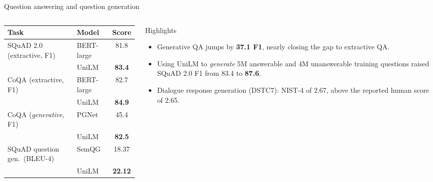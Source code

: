 \documentclass[aspectratio=169,11pt]{beamer}
\begin{document}
\begin{frame}{Question answering and question generation}
  \begin{columns}[T]
    \begin{column}{0.5\textwidth}
      \footnotesize
      \begin{tabular}{@{}llc@{}}
        \toprule
        Task & Model & Score\\
        \midrule
        SQuAD 2.0 (extractive, F1) & BERT-large & 81.8\\
        & UniLM & \textbf{83.4}\\
        CoQA (extractive, F1) & BERT-large & 82.7\\
        & UniLM & \textbf{84.9}\\
        CoQA (\emph{generative}, F1) & PGNet & 45.4\\
        & UniLM & \textbf{82.5}\\
        SQuAD question gen.\ (BLEU-4) & SemQG & 18.37\\
        & UniLM & \textbf{22.12}\\
        \bottomrule
      \end{tabular}
    \end{column}
    \begin{column}{0.46\textwidth}
      \begin{exampleblock}{Highlights}
        \small
        \begin{itemize}
          \item Generative QA jumps by \textbf{37.1 F1}, nearly closing the gap to extractive QA.
          \item Using UniLM to \emph{generate} 5M answerable and 4M unanswerable training questions raised SQuAD 2.0 F1 from 83.4 to \textbf{87.6}.
          \item Dialogue response generation (DSTC7): NIST-4 of 2.67, above the reported human score of 2.65.
        \end{itemize}
      \end{exampleblock}
    \end{column}
  \end{columns}
\end{frame}
\end{document}

